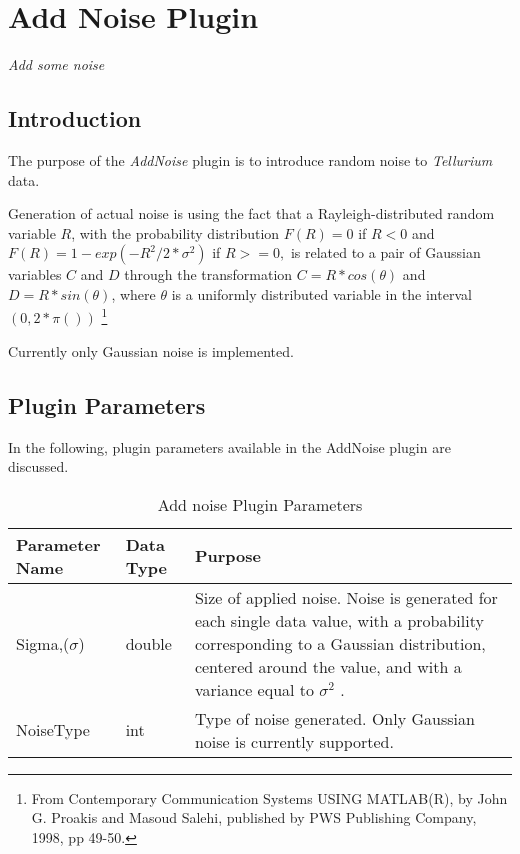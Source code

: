 \chapter*{Add Noise Plugin}
\setcounter{chapter}{1}
\emph{Add some noise}
\section{Introduction}
The purpose of the \emph{AddNoise} plugin is to introduce random noise to \emph{Tellurium} data. 

Generation of actual noise is using the fact that a Rayleigh-distributed random variable $R$, with
the probability distribution $F(R) = 0$ if $R < 0$ and $F(R) = 1 - exp(-R^2/2*\sigma^2)$ if $R >= 0, $
is related to a pair of Gaussian variables $C$ and $D$ through the transformation $C = R * cos(\theta)$ and
$D = R * sin(\theta)$, where $\theta$ is a uniformly distributed variable
in the interval $(0, 2*\pi())$ \footnote{From Contemporary Communication Systems
USING MATLAB(R), by John G. Proakis and Masoud Salehi, published by
PWS Publishing Company, 1998, pp 49-50.} 

Currently only Gaussian noise is implemented. 

 
\section{Plugin Parameters}
In the following, plugin parameters available in the AddNoise plugin are discussed.

\begin{table}[ht]
\centering %
\begin{tabular}{l l p{7.5cm}} %

Parameter Name & Data Type & Purpose \\ [0.5ex] %
\hline %
Sigma,($\sigma$)         	& 	double & Size of applied noise. Noise is generated for each single data value, with a probability corresponding to a Gaussian distribution, centered around the value, and with a variance equal to $\sigma^2$ .\\
NoiseType      	& 	int    & Type of noise generated. Only Gaussian noise is currently supported. \\

\hline %
\end{tabular}
\caption{Add noise Plugin Parameters} 
\label{table:AddNoisePluginParameters} 
\end{table}

